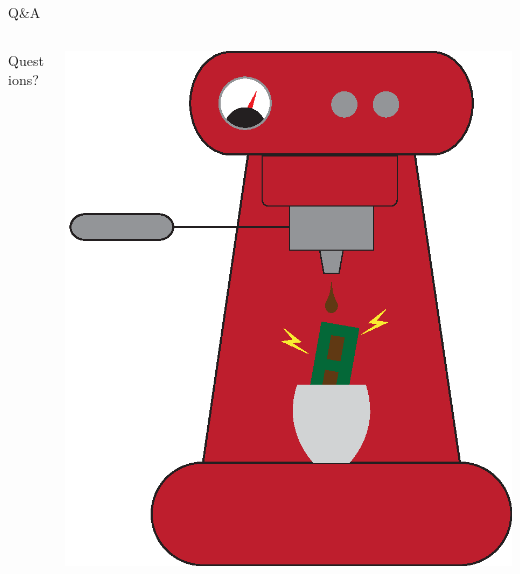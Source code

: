 \documentclass[aspectratio=169, handout]{beamer}
\begin{document}
\section*{}
\begin{frame}{Q\&A}
    \begin{columns}
        \begin{column}{.3\textwidth}
            \begin{center}
                Questions?
            \end{center}
        \end{column}
        \begin{column}{.5\textwidth}
            \includegraphics[width=.8\columnwidth]{graphics/steelbrew.eps}
        \end{column}
    \end{columns}
\end{frame}
\end{document}
